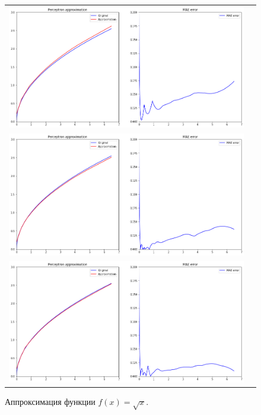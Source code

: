 \documentclass[12pt, a4paper]{article}
\begin{document}
    \begin{figure}[h]
        \center
        \begin{tabular}{cc}
            \includegraphics[width = 14cm]{f11_3_1.png} \\
            \includegraphics[width = 14cm]{f11_3_2.png} \\
            \includegraphics[width = 14cm]{f11_3_3.png} \\
        \end{tabular}
        \label{image3}
        \caption{Аппроксимация функции $f(x) = \sqrt{x}$.}
    \end{figure}
    
\end{document}
